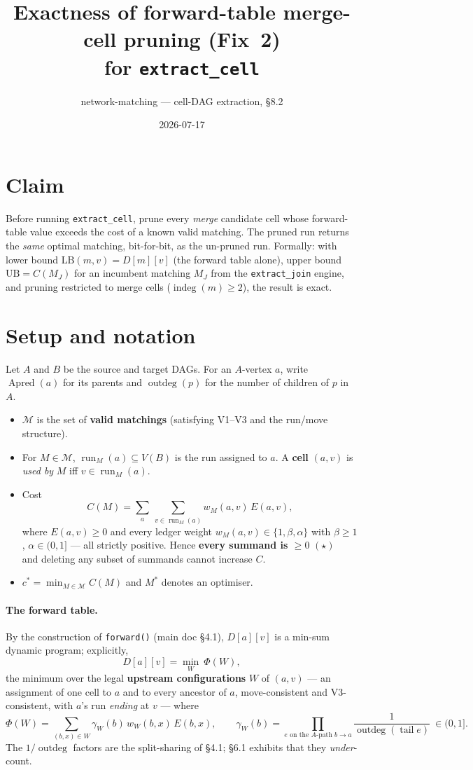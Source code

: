 \documentclass[11pt]{article}
\title{Exactness of forward-table merge-cell pruning (Fix~2)\\ for \texttt{extract\_cell}}
\author{network-matching --- cell-DAG extraction, \S8.2}
\date{2026-07-17}
\DeclareMathOperator{\outdeg}{outdeg}
\DeclareMathOperator{\indeg}{indeg}
\DeclareMathOperator{\Apred}{Apred}
\DeclareMathOperator{\rn}{run}
\DeclareMathOperator{\tail}{tail}
\newcommand{\Mcal}{\mathcal{M}}
\newcommand{\cst}{c^{\ast}}
\newcommand{\Mst}{M^{\ast}}
\begin{document}
\maketitle

\section*{Claim}

Before running \texttt{extract\_cell}, prune every \emph{merge} candidate cell whose forward-table
value exceeds the cost of a known valid matching. The pruned run returns the \emph{same} optimal
matching, bit-for-bit, as the un-pruned run. Formally: with lower bound $\mathrm{LB}(m,v)=D[m][v]$
(the forward table alone), upper bound $\mathrm{UB}=C(M_J)$ for an incumbent matching $M_J$ from the
\texttt{extract\_join} engine, and pruning restricted to merge cells ($\indeg(m)\ge 2$), the result is
exact.

\section*{Setup and notation}

Let $A$ and $B$ be the source and target DAGs. For an $A$-vertex $a$, write $\Apred(a)$ for its parents
and $\outdeg(p)$ for the number of children of $p$ in $A$.

\begin{itemize}[nosep]
  \item $\Mcal$ is the set of \textbf{valid matchings} (satisfying V1--V3 and the run/move structure).
  \item For $M\in\Mcal$, $\rn_M(a)\subseteq V(B)$ is the run assigned to $a$. A \textbf{cell} $(a,v)$ is
        \emph{used by} $M$ iff $v\in\rn_M(a)$.
  \item Cost
        \[
          C(M)=\sum_{a}\ \sum_{v\in\rn_M(a)} w_M(a,v)\,E(a,v),
        \]
        where $E(a,v)\ge 0$ and every ledger weight $w_M(a,v)\in\{1,\beta,\alpha\}$ with $\beta\ge 1$,
        $\alpha\in(0,1]$ --- all strictly positive. Hence \textbf{every summand is $\ge 0$}
        \hfill$(\star)$
        \\ and deleting any subset of summands cannot increase $C$.
  \item $\cst=\min_{M\in\Mcal}C(M)$ and $\Mst$ denotes an optimiser.
\end{itemize}

\paragraph{The forward table.}
By the construction of \texttt{forward()} (main doc \S4.1), $D[a][v]$ is a min-sum dynamic program;
explicitly,
\[
  D[a][v]=\min_{W}\ \Phi(W),
\]
the minimum over the legal \textbf{upstream configurations} $W$ of $(a,v)$ --- an assignment of one
cell to $a$ and to every ancestor of $a$, move-consistent and V3-consistent, with $a$'s run
\emph{ending} at $v$ --- where
\[
  \Phi(W)=\sum_{(b,x)\in W}\gamma_W(b)\,w_W(b,x)\,E(b,x),
  \qquad
  \gamma_W(b)=\prod_{e\text{ on the $A$-path } b\to a}\frac{1}{\outdeg(\tail e)}\ \in(0,1].
\]
The $1/\outdeg$ factors are the split-sharing of \S4.1; \S6.1 exhibits that they \emph{under}-count.
\end{document}
